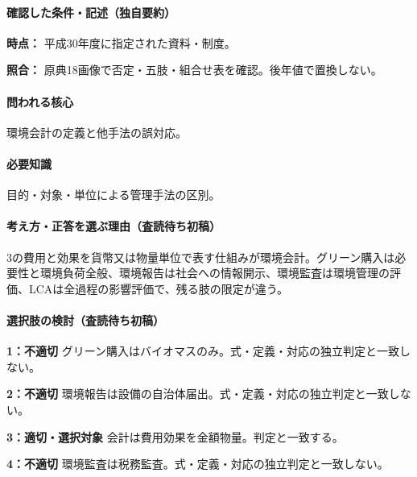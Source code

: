 \paragraph{確認した条件・記述（独自要約）}\mbox{}\par

\noindent\textbf{時点：} 平成30年度に指定された資料・制度。\par

\noindent\textbf{照合：} 原典18画像で否定・五肢・組合せ表を確認。後年値で置換しない。\par

\paragraph{問われる核心} 環境会計の定義と他手法の誤対応。

\paragraph{必要知識} 目的・対象・単位による管理手法の区別。

\paragraph{考え方・正答を選ぶ理由（査読待ち初稿）} 3の費用と効果を貨幣又は物量単位で表す仕組みが環境会計。グリーン購入は必要性と環境負荷全般、環境報告は社会への情報開示、環境監査は環境管理の評価、LCAは全過程の影響評価で、残る肢の限定が違う。

\paragraph{選択肢の検討（査読待ち初稿）}\mbox{}\par

\noindent\textbf{1：不適切} グリーン購入はバイオマスのみ。式・定義・対応の独立判定と一致しない。\par

\noindent\textbf{2：不適切} 環境報告は設備の自治体届出。式・定義・対応の独立判定と一致しない。\par

\noindent\textbf{3：適切・選択対象} 会計は費用効果を金額物量。判定と一致する。\par

\noindent\textbf{4：不適切} 環境監査は税務監査。式・定義・対応の独立判定と一致しない。\par

